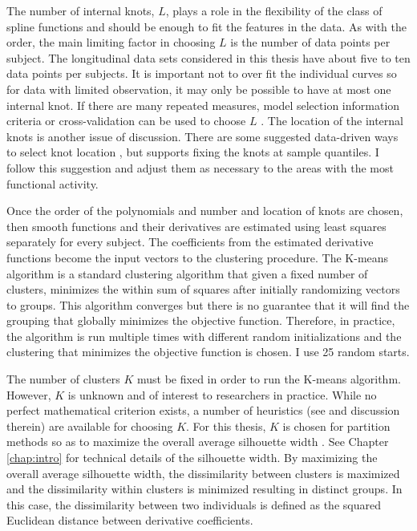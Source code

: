 The number of internal knots, $L$, plays a role in the flexibility of the class of spline functions and should be enough to fit the features in the data. As with the order, the main limiting factor in choosing $L$ is the number of data points per subject. The longitudinal data sets considered in this thesis have about five to ten data points per subjects. It is important not to over fit the individual curves so for data with limited observation, it may only be possible to have at most one internal knot. If there are many repeated measures, model selection information criteria or cross-validation can be used to choose $L$ \cite{rice2001}. The location of the internal knots is another issue of discussion. There are some suggested data-driven ways to select knot location \cite{shanggang2001}, but \textcite{ruppert2002} supports fixing the knots at sample quantiles. I follow this suggestion and adjust them as necessary to the areas with the most functional activity. 

Once the order of the polynomials and number and location of knots are chosen, then smooth functions and their derivatives are estimated using least squares separately for every subject. The coefficients from the estimated derivative functions become the input vectors to the clustering procedure. The K-means algorithm is a standard clustering algorithm that given a fixed number of clusters, minimizes the within sum of squares after initially randomizing vectors to groups. This algorithm converges but there is no guarantee that it will find the grouping that globally minimizes the objective function. Therefore, in practice, the algorithm is run multiple times with different random initializations and the clustering that minimizes the objective function is chosen. I use 25 random starts.

The number of clusters $K$ must be fixed in order to run the K-means algorithm. However, $K$ is unknown and of interest to researchers in practice. While no perfect mathematical criterion exists, a number of heuristics (see \cite{tibshirani2001} and discussion therein) are available for choosing $K$. For this thesis, $K$ is chosen for partition methods so as to maximize the overall average silhouette width \cite{rousseeuw1987}. See Chapter \ref{chap:intro} for technical details of the silhouette width. By maximizing the overall average silhouette width, the dissimilarity between clusters is maximized and the dissimilarity within clusters is minimized resulting in distinct groups. In this case, the dissimilarity between two individuals is defined as the squared Euclidean distance between derivative coefficients.

